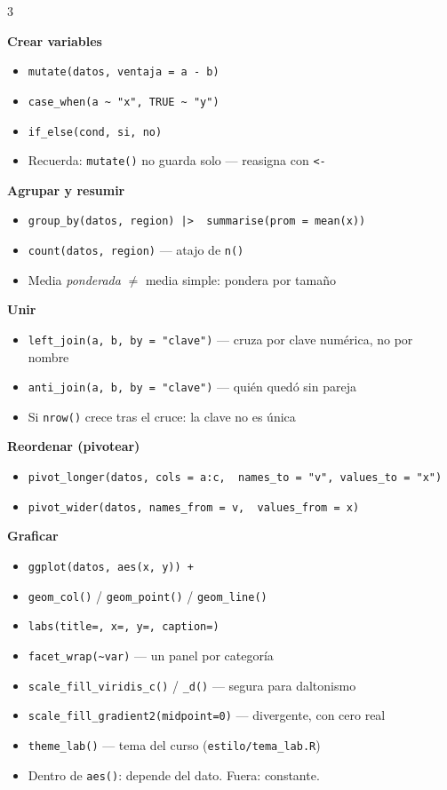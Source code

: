 \documentclass[9pt]{extarticle}
\newcommand{\tarea}[1]{%
  \par\vspace{8pt}%
  \noindent\colorbox{verdeITAM}{\parbox[c][14pt]{\dimexpr\linewidth-2\fboxsep\relax}{\hspace{2pt}\color{white}\bfseries\fontsize{9.3}{10}\selectfont #1}}%
  \par\vspace{4pt}%
}
\newcommand{\co}[1]{\texttt{\color{verdeProfundo}#1}}
\begin{document}
\begin{multicols}{3}
\tarea{Crear variables}
\begin{itemize}
  \item \co{mutate(datos, ventaja = a - b)}
  \item \co{case\_when(a \~{} "x", TRUE \~{} "y")}
  \item \co{if\_else(cond, si, no)}
  \item Recuerda: \co{mutate()} no guarda solo --- reasigna con \co{<-}
\end{itemize}

\tarea{Agrupar y resumir}
\begin{itemize}
  \item \co{group\_by(datos, region) |>}\newline\co{\ \ summarise(prom = mean(x))}
  \item \co{count(datos, region)} --- atajo de \co{n()}
  \item Media \emph{ponderada} $\neq$ media simple: pondera por tamaño
\end{itemize}

\tarea{Unir}
\begin{itemize}
  \item \co{left\_join(a, b, by = "clave")} --- cruza por clave numérica, no por nombre
  \item \co{anti\_join(a, b, by = "clave")} --- quién quedó sin pareja
  \item Si \co{nrow()} crece tras el cruce: la clave no es única
\end{itemize}

\columnbreak


\tarea{Reordenar (pivotear)}
\begin{itemize}
  \item \co{pivot\_longer(datos, cols = a:c,}\newline\co{\ \ names\_to = "v", values\_to = "x")}
  \item \co{pivot\_wider(datos, names\_from = v,}\newline\co{\ \ values\_from = x)}
\end{itemize}

\tarea{Graficar}
\begin{itemize}
  \item \co{ggplot(datos, aes(x, y)) +}
  \item \co{geom\_col()} / \co{geom\_point()} / \co{geom\_line()}
  \item \co{labs(title=, x=, y=, caption=)}
  \item \co{facet\_wrap(\~{}var)} --- un panel por categoría
  \item \co{scale\_fill\_viridis\_c()} / \co{\_d()} --- segura para daltonismo
  \item \co{scale\_fill\_gradient2(midpoint=0)} --- divergente, con cero real
  \item \co{theme\_lab()} --- tema del curso (\co{estilo/tema\_lab.R})
  \item Dentro de \co{aes()}: depende del dato. Fuera: constante.
\end{itemize}


\end{multicols}
\end{document}
